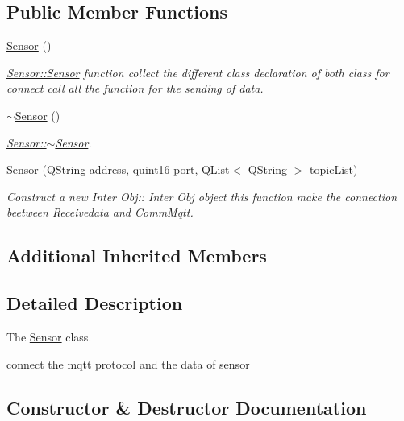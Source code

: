 \subsection*{Public Member Functions}
\begin{DoxyCompactItemize}
\item 
\hyperlink{classSensor_a342d6d11ef572c8cba92cb76fb1a294b}{Sensor} ()
\begin{DoxyCompactList}\small\item\em \hyperlink{classSensor_a342d6d11ef572c8cba92cb76fb1a294b}{Sensor\+::\+Sensor} function collect the different class declaration of both class for connect call all the function for the sending of data. \end{DoxyCompactList}\item 
\mbox{\label{classSensor_aee8c70e7ef05ce65e7ee33686b5d7db2}} 
\hyperlink{classSensor_aee8c70e7ef05ce65e7ee33686b5d7db2}{$\sim$\+Sensor} ()
\begin{DoxyCompactList}\small\item\em \hyperlink{classSensor_aee8c70e7ef05ce65e7ee33686b5d7db2}{Sensor\+::$\sim$\+Sensor}. \end{DoxyCompactList}\item 
\hyperlink{classSensor_a03d3f7e3089eaceba93b485c57e3b21d}{Sensor} (Q\+String address, quint16 port, Q\+List$<$ Q\+String $>$ topic\+List)
\begin{DoxyCompactList}\small\item\em Construct a new Inter Obj\+:\+: Inter Obj object this function make the connection beetween Receivedata and Comm\+Mqtt. \end{DoxyCompactList}\end{DoxyCompactItemize}
\subsection*{Additional Inherited Members}


\subsection{Detailed Description}
The \hyperlink{classSensor}{Sensor} class. 

connect the mqtt protocol and the data of sensor 

\subsection{Constructor \& Destructor Documentation}
\mbox{\label{classSensor_a342d6d11ef572c8cba92cb76fb1a294b}} 
